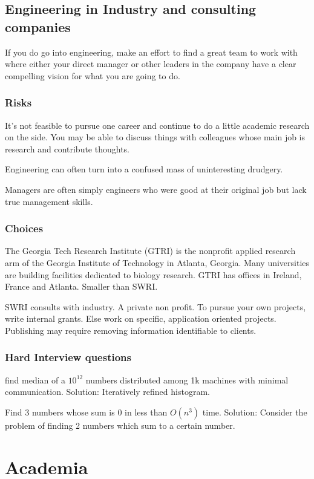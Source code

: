 \documentclass[oneside, article]{memoir}
\begin{document}
\section{Engineering in Industry and consulting companies}
If you do go into engineering, make an effort to find a great team to work with where either your direct manager or other leaders in the company have a clear compelling vision for what you are going to do.

\subsection{Risks}
It's not feasible to pursue one career and continue to do a little academic research on the side. You may be able to discuss things with colleagues whose main job is research and contribute thoughts.

Engineering can often turn into a confused mass of uninteresting drudgery.

Managers are often simply engineers who were good at their original job but lack true management skills.

\subsection{Choices}
The Georgia Tech Research Institute (GTRI) is the nonprofit applied research arm of the Georgia Institute of Technology in Atlanta, Georgia. Many universities are building facilities dedicated to biology research. GTRI has offices in Ireland, France and Atlanta. Smaller than SWRI.

SWRI consults with industry. A private non profit. To pursue your own projects, write internal grants. Else work on specific, application oriented projects. Publishing may require removing information identifiable to clients.

\subsection{Hard Interview questions}
find median of a $10^{12}$ numbers distributed among 1k machines with minimal communication. Solution: Iteratively refined histogram.

Find 3 numbers whose sum is 0 in less than $O(n^3)$ time. Solution: Consider the problem of finding 2 numbers which sum to a certain number.

\chapter{Academia}
\end{document}
